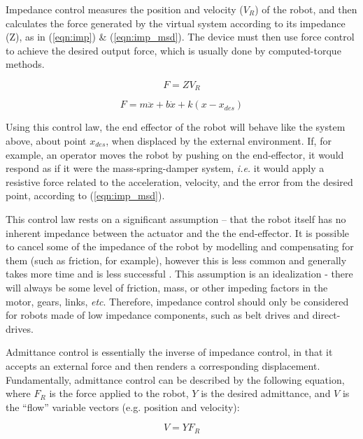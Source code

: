 \documentclass[12pt]{report}
\begin{document}
Impedance control measures the position and velocity ($V_R$) of the robot, and then calculates the force generated by the virtual system according to its impedance (Z), as in (\ref{eqn:imp}) \& (\ref{eqn:imp_msd}). The device must then use force control to achieve the desired output force, which is usually done by computed-torque methods. 

\begin{equation} \label{eqn:imp}
	F = ZV_R 
\end{equation}  

\begin{equation} \label{eqn:imp_msd}
	F = m\ddot{x} + b\dot{x} + k(x - x_{des})
\end{equation} 

Using this control law, the end effector of the robot will behave like the system above, about point $x_{des}$, when displaced by the external environment. If, for example, an operator moves the robot by pushing on the end-effector, it would respond as if it were the mass-spring-damper system, \textit{i.e.} it would apply a resistive force related to the acceleration, velocity, and the error from the desired point, according to (\ref{eqn:imp_msd}).

	This control law rests on a significant assumption -- that the robot itself has no inherent impedance between the actuator and the the end-effector. It is possible to cancel some of the impedance of the robot by modelling and compensating for them (such as friction, for example), however this is less common and generally takes more time and is less successful \cite{Colgate1988}. This assumption is an idealization - there will always be some level of friction, mass, or other impeding factors in the motor, gears, links, \textit{etc}. Therefore, impedance control should only be considered for robots made of low impedance components, such as belt drives and direct-drives. 
	

	
	Admittance control is essentially the inverse of impedance control, in that it accepts an external force and then renders a corresponding displacement. Fundamentally, admittance control can be described by the following equation, where $F_R$ is the force applied to the robot, $Y$ is the desired admittance, and $V$ is the ``flow'' variable vectors (e.g. position and velocity):
	
	\begin{equation}
	V = YF_R 
	\end{equation} 
	
\end{document}
